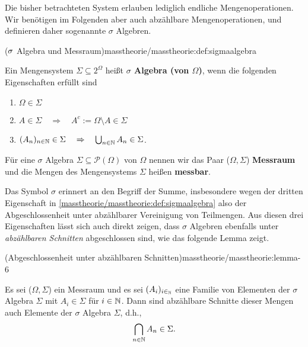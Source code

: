 \par
Die bisher betrachteten System erlauben lediglich endliche Mengenoperationen. Wir benötigen im Folgenden aber auch abzählbare Mengenoperationen, und definieren daher sogenannte \(\sigma\) Algebren.
\begin{definition}{(\protect\(\sigma\protect\) Algebra und Messraum)}{masstheorie/masstheorie:def:sigmaalgebra}



\par
Ein Mengensystem \(\Sigma \subseteq 2^\Omega\) heißt \textbf{\(\sigma\) Algebra (von \(\Omega\))}, wenn die folgenden Eigenschaften erfüllt sind
\begin{enumerate}

\item {} 
\par
\(\Omega\in \Sigma\)

\item {} 
\par
\(A\in \Sigma \quad \Rightarrow \quad A^c:=\Omega \setminus A\in \Sigma\)

\item {} 
\par
\((A_n)_{n\in\mathbb{N}} \in \Sigma \quad \Rightarrow \quad \bigcup_{n\in \mathbb{N}} A_n\in \Sigma\).

\end{enumerate}

\par
Für eine \(\sigma\) Algebra \(\Sigma \subseteq \mathcal{P}(\Omega)\) von \(\Omega\) nennen wir das Paar (\(\Omega,\Sigma\)) \textbf{Messraum} und die Mengen des Mengensystems \(\Sigma\) heißen \textbf{messbar}.
\end{definition}

\par
Das Symbol \(\sigma\) erinnert an den Begriff der Summe, insbesondere wegen der dritten Eigenschaft in \cref{masstheorie/masstheorie:def:sigmaalgebra}  also der Abgeschlossenheit unter abzählbarer Vereinigung von Teilmengen.
Aus diesen drei Eigenschaften lässt sich auch direkt zeigen, dass \(\sigma\) Algebren ebenfalls unter \emph{abzählbaren Schnitten} abgeschlossen sind, wie das folgende Lemma zeigt.
\begin{lemma}{(Abgeschlossenheit unter abzählbaren Schnitten)}{masstheorie/masstheorie:lemma-6}



\par
Es sei (\(\Omega,\Sigma\)) ein Messraum und es sei \((A_i)_{i\in_{\mathbb{N}}}\) eine Familie von Elementen der \(\sigma\) Algebra \(\Sigma\) mit \(A_i \in \Sigma\) für \(i \in \mathbb{N}\).
Dann sind abzählbare Schnitte dieser Mengen auch Elemente der \(\sigma\) Algebra \(\Sigma\), d.h.,
\begin{align*}
\bigcap_{n \in \mathbb{N}} A_n \in \Sigma.
\end{align*}\end{lemma}

